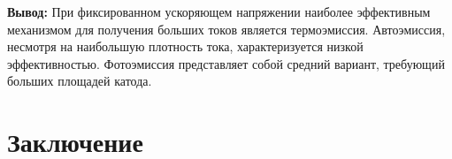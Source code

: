 \documentclass[12pt]{article}
\begin{document}



\textbf{Вывод:} При фиксированном ускоряющем напряжении наиболее эффективным механизмом для получения больших токов является термоэмиссия. Автоэмиссия, несмотря на наибольшую плотность тока, характеризуется низкой эффективностью. Фотоэмиссия представляет собой средний вариант, требующий больших площадей катода.





\section*{Заключение}
\end{document}

